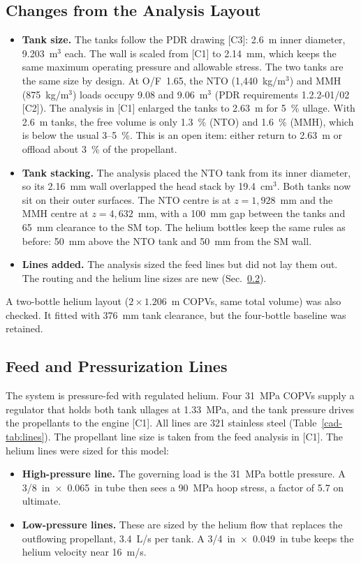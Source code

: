 \subsection{Changes from the Analysis Layout}\label{cad-sec:changes}
\begin{itemize}
\item \textbf{Tank size.} The tanks follow the PDR drawing [C3]: 2.6~m inner diameter, 9.203~m$^3$ each. The wall is
scaled from [C1] to 2.14~mm, which keeps the same maximum operating pressure and allowable stress. The two tanks are the
same size by design. At O/F~1.65, the NTO (1,440~kg/m$^3$) and MMH (875~kg/m$^3$) loads occupy 9.08 and 9.06~m$^3$
(PDR requirements 1.2.2-01/02 [C2]). The analysis in [C1] enlarged the tanks to 2.63~m for 5~\% ullage. With 2.6~m tanks,
the free volume is only 1.3~\% (NTO) and 1.6~\% (MMH), which is below the usual 3--5~\%. This is an open item: either
return to 2.63~m or offload about 3~\% of the propellant.
\item \textbf{Tank stacking.} The analysis placed the NTO tank from its inner diameter, so its 2.16~mm wall overlapped
the head stack by 19.4~cm$^3$. Both tanks now sit on their outer surfaces. The NTO centre is at $z = 1{,}928$~mm and
the MMH centre at $z = 4{,}632$~mm, with a 100~mm gap between the tanks and 65~mm clearance to the SM top. The helium
bottles keep the same rules as before: 50~mm above the NTO tank and 50~mm from the SM wall.
\item \textbf{Lines added.} The analysis sized the feed lines but did not lay them out. The routing and the helium line
sizes are new (Sec.~\ref{cad-sec:lines}).
\end{itemize}
A two-bottle helium layout ($2\times1.206$~m COPVs, same total volume) was also checked. It fitted with 376~mm tank
clearance, but the four-bottle baseline was retained.

\subsection{Feed and Pressurization Lines}\label{cad-sec:lines}
The system is pressure-fed with regulated helium. Four 31~MPa COPVs supply a regulator that holds both tank ullages at
1.33~MPa, and the tank pressure drives the propellants to the engine [C1]. All lines are 321 stainless steel
(Table~\ref{cad-tab:lines}). The propellant line size is taken from the feed analysis in [C1]. The helium lines were sized
for this model:
\begin{itemize}
\item \textbf{High-pressure line.} The governing load is the 31~MPa bottle pressure. A 3/8~in~$\times$~0.065~in tube
then sees a 90~MPa hoop stress, a factor of 5.7 on ultimate.
\item \textbf{Low-pressure lines.} These are sized by the helium flow that replaces the outflowing propellant, 3.4~L/s
per tank. A 3/4~in~$\times$~0.049~in tube keeps the helium velocity near 16~m/s.
\end{itemize}

